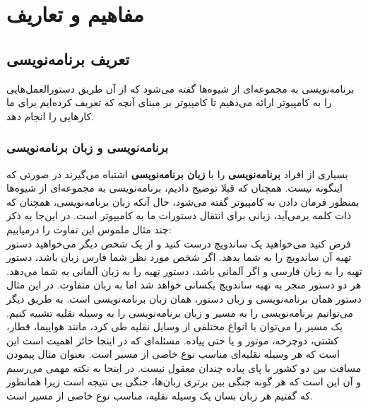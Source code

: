 \part{مفاهیم و تعاریف}
\chapter{تعریف برنامه‌نویسی}
برنامه‌نویسی به مجموعه‌ای از شیوه‌ها گفته می‌شود که از  آن طریق دستورالعمل‌هایی را به کامپیوتر ارائه می‌دهیم تا کامپیوتر بر مبنای آنچه که تعریف کرده‌ایم برای ما کارهایی را انجام دهد. 
\section{برنامه‌نویسی و زبان برنامه‌نویسی}
بسیاری از افراد \textbf{برنامه‌نویسی } را با \textbf{زبان برنامه‌نویسی} اشتباه می‌گیرند در صورتی که اینگونه نیست. همچنان که قبلا توضیح دادیم، برنامه‌نویسی به مجموعه‌ای از شیوه‌ها بمنظور فرمان دادن به کامپیوتر گفته می‌شود، حال آنکه زبان برنامه‌نویسی، همچنان که ذات کلمه برمی‌آید، زبانی برای انتقال دستورات ما به کامیپوتر است. در این‌جا به ذکر چند مثال ملموس این تفاوت را درمیابیم:\\
فرض کنید می‌خواهید یک ساندویچ درست کنید و از یک شخص دیگر می‌خواهید دستور تهیه آن ساندویچ را به شما بدهد. اگر شخص مورد نظر شما فارس زبان باشد، دستور تهیه را به زبان فارسی و اگر آلمانی باشد، دستور تهیه را به زبان آلمانی به شما می‌دهد. هر دو دستور منجر به تهیه ساندویچ یکسانی خواهد شد اما به زبان متفاوت. در این مثال دستور همان برنامه‌نویسی و زبان دستور، همان زبان برنامه‌نویسی است.
به طریق دیگر می‌توانیم برنامه‌نویسی را به مسیر و  زبان برنامه‌نویسی را به وسیله نقلیه تشبیه کنیم. یک مسیر را می‌توان با انواع مختلفی از وسایل نقلیه طی کرد، مانند هواپیما، قطار، کشتی، دوچرخه، موتور و یا حتی پیاده. مسئله‌ای که در اینجا حائز اهمیت است این است که هر وسیله نقلیه‌ای مناسب نوع خاصی از مسیر است. بعنوان مثال پیمودن مسافت بین دو کشور با پای پیاده چندان معقول نیست. در اینجا به نکته مهمی می‌رسیم و آن این است که هر گونه جنگی بین برتری زبان‌ها، جنگی بی نتیجه است زیرا همانطور که گفتیم هر زبان بسان یک وسیله نقلیه، مناسب نوع خاصی از مسیر است.